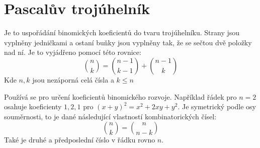 \documentclass[12pt]{article}
\begin{document}
\section*{Pascalův trojúhelník}
Je to uspořádání binomických koeficientů do tvaru trojúhelníku. Strany jsou vyplněny jedničkami a ostaní buňky jsou vyplněny tak, že se sečtou dvě položky nad ní. Je to vyjádřeno pomocí této rovnice:
\[\binom{n}{k} = \binom{n-1}{k-1} + \binom{n-1}{k}\]
Kde $n,k$ jsou nezáporná celá čísla a $k\leq n$
\begin{center}
\end{center}
Používá se pro určení koeficientů binomického rozvoje. Například řádek pro $n = 2$ osahuje koeficienty $1, 2, 1$ pro $(x+y)^2 = x^2 + 2xy + y^2$.
Je symetrický podle osy souměrnosti, to je dané následující vlastností kombinatorických čísel:
\[\binom{n}{k} = \binom{n}{n-k}\]
Také je druhé a předposlední číslo v řádku rovno $n$.
\end{document}
